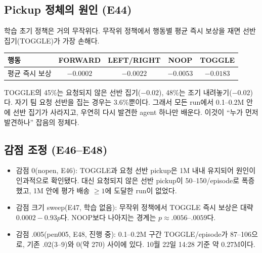 \documentclass[11pt]{article}
\begin{document}
\subsection{Pickup 정체의 원인 (E44)}
학습 초기 정책은 거의 무작위다. 무작위 정책에서 행동별 평균 즉시 보상을 재면 선반 집기(TOGGLE)가 가장 손해다.
\begin{center}
\begin{tabular}{lcccc}
\toprule
행동 & FORWARD & LEFT/RIGHT & NOOP & TOGGLE \\
\midrule
평균 즉시 보상 & $-0.0002$ & $-0.0022$ & $-0.0053$ & $-0.0183$ \\
\bottomrule
\end{tabular}
\end{center}
TOGGLE의 45\%는 요청되지 않은 선반 집기($-0.02$), 48\%는 조기 내려놓기($-0.02$)다. 자기 팀 요청 선반을 집는 경우는 3.6\%뿐이다.
그래서 모든 run에서 0.1--0.2M 안에 선반 집기가 사라지고, 우연히 다시 발견한 agent 하나만 배운다. 이것이 ``누가 먼저 발견하나'' 잡음의 정체다.

\subsection{감점 조정 (E46--E48)}
\begin{itemize}
  \item 감점 0(nopen, E46): TOGGLE과 요청 선반 pickup은 1M 내내 유지되어 원인이 인과적으로 확인됐다. 대신 요청되지 않은 선반 pickup이 50--150/episode로 폭증했고, 1M 안에 평가 배송 $\ge 1$에 도달한 run이 없었다.
  \item 감점 크기 sweep(E47, 학습 없음): 무작위 정책에서 TOGGLE 즉시 보상은 대략 $0.0002 - 0.93p$다. NOOP보다 나아지는 경계는 $p \approx .0056$--$.0059$다.
  \item 감점 .005(pen005, E48, 진행 중): 0.1--0.2M 구간 TOGGLE/episode가 87--106으로, 기존 .02(3--9)와 0(약 270) 사이에 있다. 10월 22일 14:28 기준 약 0.27M이다.
\end{itemize}
\end{document}
